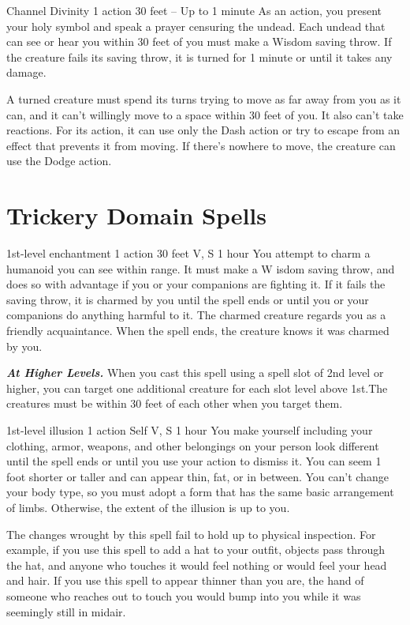 \documentclass[10pt,twoside,twocolumn,openany]{book}
\newcommand\impact[1]{
	\textbf{\textit{#1}}
}
\begin{document}
{Channel Divinity}
{\color{action} 1 action}
{30 feet}
{--}
{Up to 1 minute}
%
As an action, you present your holy symbol and speak a prayer censuring the undead. Each undead that can see or hear you within 30 feet of you must make a Wisdom saving throw. If the creature fails its saving throw, it is turned for 1 minute or until it takes any damage.

A turned creature must spend its turns trying to move as far away from you as it can, and it can't willingly
move to a space within 30 feet of you. It also can't take reactions. For its action, it can use only the Dash action or try to escape from an effect that prevents it from moving. If there's nowhere to move, the creature can use the Dodge action.

\chapter{Trickery Domain Spells}
{1st-level enchantment}
{\color{action} 1 action}
{30 feet}
{V, S}
{1 hour}
%
You attempt to charm a humanoid you can see within range. It must make a W isdom saving throw, and does so with advantage if you or your companions are fighting it. If it fails the saving throw, it is charmed by you until the spell ends or until you or your companions do anything harmful to it. The charmed creature regards you as a friendly acquaintance. When the spell ends, the creature knows it was charmed by you.

\impact{At Higher Levels.} When you cast this spell using a spell slot of 2nd level or higher, you can target one additional creature for each slot level above 1st.The creatures must be within 30 feet of each other when you target them.

{1st-level illusion}
{\color{action} 1 action}
{Self}
{V, S}
{1 hour}
%
You make yourself including your clothing, armor, weapons, and other belongings on your person look different until the spell ends or until you use your action to dismiss it. You can seem 1 foot shorter or taller and can appear thin, fat, or in between. You can't change your body type, so you must adopt a form that has the same basic arrangement of limbs. Otherwise, the extent of the illusion is up to you.

The changes wrought by this spell fail to hold up to physical inspection. For example, if you use this spell to add a hat to your outfit, objects pass through the hat, and anyone who touches it would feel nothing or would feel your head and hair. If you use this spell to appear thinner than you are, the hand of someone who reaches out to touch you would bump into you while it was seemingly still in midair.
\end{document}
